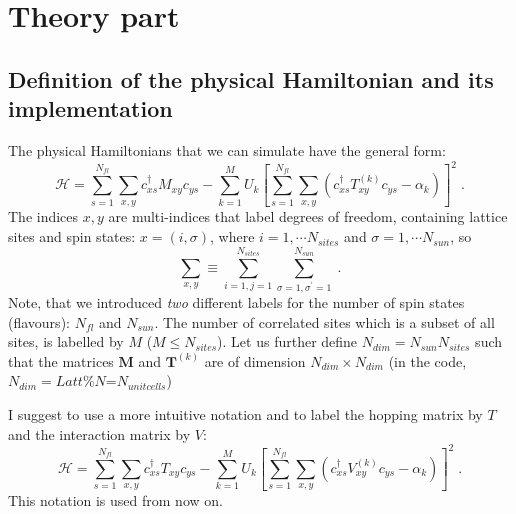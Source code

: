 \section{Theory part}


\subsection{Definition of the physical Hamiltonian and its implementation}

The physical Hamiltonians that we can simulate have the general form:
\begin{equation}
\label{eqn_general_ham1}
\mathcal{H}
=\sum\limits_{s=1}^{N_{fl}}\sum\limits_{x,y}
c^{\dagger}_{x s}M_{xy}c^{\phantom\dagger}_{ys}
-\sum\limits_{k=1}^{M}U_{k}\left[
\sum\limits_{s=1}^{N_{fl}}\sum\limits_{x,y}
\left( 
c^{\dagger}_{xs}T^{(k)}_{xy}c^{\phantom\dagger}_{ys}-\alpha_{k}
\right)
\right]^{2}\;.
\end{equation}
The indices $x,y$ are multi-indices that label degrees of freedom, containing lattice sites and spin states: $x=(i,\sigma)$, 
where $i=1,\cdots N_{sites}$ and $\sigma=1,\cdots N_{sun}$, so
\begin{equation}
\sum\limits_{x,y}\equiv
\sum\limits_{i=1,j=1}^{N_{sites}}\sum\limits_{\sigma=1,\sigma^{\prime}=1}^{N_{sun}}\;.
\end{equation}
Note, that  we introduced \textit{two} different labels for the number of spin states (flavours): 
$N_{fl}$ and $N_{sun}$.
The number of correlated sites which is a subset of all sites, is labelled by $M$  ($M\leq N_{sites}$).
Let us further define  $N_{dim}=N_{sun} N_{sites}$ such that the matrices $\bm{M}$ and $\bm{T}^{(k)}$ are of dimension $N_{dim}\times N_{dim}$ (in the code, $N_{dim}=Latt\%N$=$N_{unitcells}$)

I suggest to use a more intuitive notation and to label the hopping matrix by $T$ and the interaction matrix by $V$:
\begin{equation}
\label{eqn_general_ham2}
\mathcal{H}
=\sum\limits_{s=1}^{N_{fl}}\sum\limits_{x,y}
c^{\dagger}_{xs}T_{xy}c^{\phantom\dagger}_{ys}
-\sum\limits_{k=1}^{M}U_{k}\left[
\sum\limits_{s=1}^{N_{fl}}\sum\limits_{x,y}
\left( 
c^{\dagger}_{xs}V^{(k)}_{xy}c^{\phantom\dagger}_{y s}-\alpha_{k}
\right)
\right]^{2}\;.
\end{equation}
This notation is used from now on.

